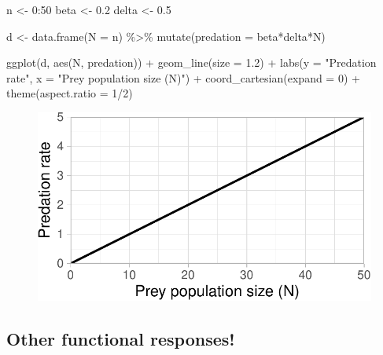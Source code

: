 \documentclass[
  letterpaper,
  DIV=11,
  numbers=noendperiod]{scrartcl}
\newenvironment{Shaded}{\begin{snugshade}}{\end{snugshade}}
\newcommand{\AttributeTok}[1]{\textcolor[rgb]{0.40,0.45,0.13}{#1}}
\newcommand{\DecValTok}[1]{\textcolor[rgb]{0.68,0.00,0.00}{#1}}
\newcommand{\FloatTok}[1]{\textcolor[rgb]{0.68,0.00,0.00}{#1}}
\newcommand{\FunctionTok}[1]{\textcolor[rgb]{0.28,0.35,0.67}{#1}}
\newcommand{\NormalTok}[1]{\textcolor[rgb]{0.00,0.23,0.31}{#1}}
\newcommand{\OtherTok}[1]{\textcolor[rgb]{0.00,0.23,0.31}{#1}}
\newcommand{\SpecialCharTok}[1]{\textcolor[rgb]{0.37,0.37,0.37}{#1}}
\newcommand{\StringTok}[1]{\textcolor[rgb]{0.13,0.47,0.30}{#1}}
\begin{document}
\begin{Shaded}
\begin{Highlighting}[]
\NormalTok{n }\OtherTok{\textless{}{-}} \DecValTok{0}\SpecialCharTok{:}\DecValTok{50}
\NormalTok{beta }\OtherTok{\textless{}{-}} \FloatTok{0.2}
\NormalTok{delta }\OtherTok{\textless{}{-}} \FloatTok{0.5}

\NormalTok{d }\OtherTok{\textless{}{-}} \FunctionTok{data.frame}\NormalTok{(}\AttributeTok{N =}\NormalTok{ n) }\SpecialCharTok{\%\textgreater{}\%} 
  \FunctionTok{mutate}\NormalTok{(}\AttributeTok{predation =}\NormalTok{ beta}\SpecialCharTok{*}\NormalTok{delta}\SpecialCharTok{*}\NormalTok{N)}

\FunctionTok{ggplot}\NormalTok{(d, }\FunctionTok{aes}\NormalTok{(N, predation)) }\SpecialCharTok{+}
  \FunctionTok{geom\_line}\NormalTok{(}\AttributeTok{size =} \FloatTok{1.2}\NormalTok{) }\SpecialCharTok{+} 
  \FunctionTok{labs}\NormalTok{(}\AttributeTok{y =} \StringTok{"Predation rate"}\NormalTok{, }\AttributeTok{x =} \StringTok{"Prey population size (N)"}\NormalTok{) }\SpecialCharTok{+}
  \FunctionTok{coord\_cartesian}\NormalTok{(}\AttributeTok{expand =} \DecValTok{0}\NormalTok{) }\SpecialCharTok{+} 
  \FunctionTok{theme}\NormalTok{(}\AttributeTok{aspect.ratio =} \DecValTok{1}\SpecialCharTok{/}\DecValTok{2}\NormalTok{)}
\end{Highlighting}
\end{Shaded}

\begin{figure}[H]

{\centering \includegraphics{ecological_interactions_files/figure-pdf/unnamed-chunk-14-1.pdf}

}

\end{figure}

\hypertarget{other-functional-responses}{%
\subsection{Other functional
responses!}\label{other-functional-responses}}
\end{document}
